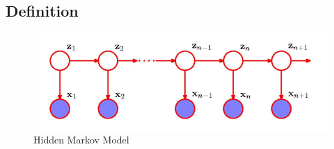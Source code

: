\documentclass[a4, english]{article}
\begin{document}
\subsection{Definition}
\begin{figure}[h]
	\centering
	\includegraphics[width=\linewidth]{img/markov_diagram}
	\caption{Hidden Markov Model \label{hidden_diagram}}
\end{figure}
\end{document}

